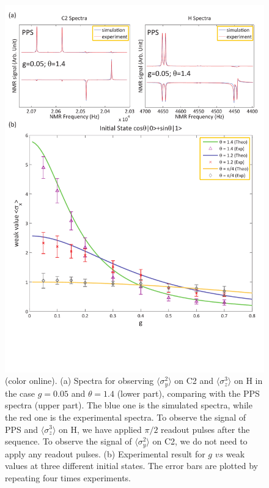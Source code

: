 \documentclass[prl,twocolumn,showpacs]{revtex4}
\begin{document}
\begin{figure}[h] \centering
\includegraphics[width=\columnwidth]{gweak.pdf}
\caption{(color online). (a) Spectra for observing $\langle \sigma_y^2 \rangle$ on C2 and $\langle \sigma_z^3 \rangle$ on H in the case $g=0.05$ and $\theta = 1.4$ (lower part), comparing with the PPS spectra (upper part). The blue one is the simulated spectra, while the red one is the experimental spectra. To observe the signal of PPS and $\langle \sigma_z^3 \rangle$ on H, we have applied $\pi/2$ readout pulses after the sequence. To observe the signal of $\langle \sigma_y^2 \rangle$ on C2, we do not need to apply any readout pulses. (b) Experimental result for $g$ $vs$ weak values at three different  initial states. The error bars are plotted by repeating four times experiments.}\label{gweak}
\end{figure}
\end{document}
